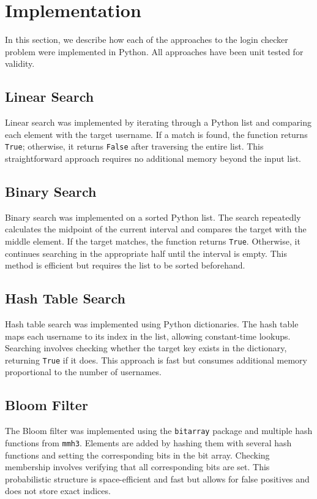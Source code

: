 \documentclass[acmsmall,screen, nonacm]{acmart}
\begin{document}
\section{Implementation}
In this section, we describe how each of the approaches to the login checker problem were implemented in Python.
All approaches have been unit tested for validity.

\subsection{Linear Search}
Linear search was implemented by iterating through a Python list and comparing each element with the target username.
If a match is found, the function returns \texttt{True}; otherwise, it returns \texttt{False} after traversing the entire list.
This straightforward approach requires no additional memory beyond the input list.

\subsection{Binary Search}
Binary search was implemented on a sorted Python list.
The search repeatedly calculates the midpoint of the current interval and compares the target with the middle element.
If the target matches, the function returns \texttt{True}.
Otherwise, it continues searching in the appropriate half until the interval is empty.
This method is efficient but requires the list to be sorted beforehand.

\subsection{Hash Table Search}
Hash table search was implemented using Python dictionaries.
The hash table maps each username to its index in the list, allowing constant-time lookups.
Searching involves checking whether the target key exists in the dictionary, returning \texttt{True} if it does.
This approach is fast but consumes additional memory proportional to the number of usernames.

\subsection{Bloom Filter}
The Bloom filter was implemented using the \texttt{bitarray} package and multiple hash functions from \texttt{mmh3}.
Elements are added by hashing them with several hash functions and setting the corresponding bits in the bit array.
Checking membership involves verifying that all corresponding bits are set.
This probabilistic structure is space-efficient and fast but allows for false positives and does not store exact indices.
\end{document}
